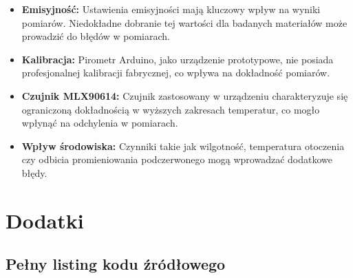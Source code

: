 \begin{itemize}
    \item \textbf{Emisyjność:} Ustawienia emisyjności mają kluczowy wpływ na wyniki pomiarów. Niedokładne dobranie tej wartości dla badanych materiałów może prowadzić do błędów w pomiarach.
    \item \textbf{Kalibracja:} Pirometr Arduino, jako urządzenie prototypowe, nie posiada profesjonalnej kalibracji fabrycznej, co wpływa na dokładność pomiarów.
    \item \textbf{Czujnik MLX90614:} Czujnik zastosowany w urządzeniu charakteryzuje się ograniczoną dokładnością w wyższych zakresach temperatur, co mogło wpłynąć na odchylenia w pomiarach.
    \item \textbf{Wpływ środowiska:} Czynniki takie jak wilgotność, temperatura otoczenia czy odbicia promieniowania podczerwonego mogą wprowadzać dodatkowe błędy.
\end{itemize}




\chapter*{Dodatki}

\section*{Pełny listing kodu źródłowego}

